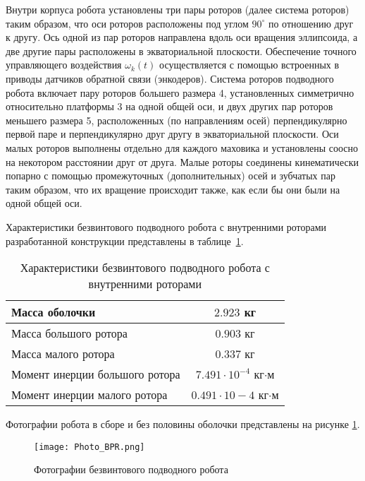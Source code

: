 Внутри корпуса робота установлены три пары роторов (далее система роторов) таким образом, что оси роторов расположены под углом $90^\circ$ по отношению друг к другу. Ось одной из пар роторов направлена вдоль оси вращения эллипсоида, а две другие пары расположены в экваториальной плоскости. Обеспечение точного управляющего воздействия $\omega_k (t)$ осуществляется с помощью встроенных в приводы датчиков обратной связи (энкодеров). Система роторов подводного робота включает пару роторов большего размера 4, установленных симметрично относительно платформы 3 на одной общей оси, и двух других пар роторов меньшего размера 5, расположенных (по направлениям осей) перпендикулярно первой паре и перпендикулярно друг другу в экваториальной плоскости. Оси малых роторов выполнены отдельно для каждого маховика и установлены соосно на некотором расстоянии друг от друга. Малые роторы соединены кинематически попарно с помощью промежуточных (дополнительных) осей и зубчатых пар таким образом, что их вращение происходит также, как если бы они были на одной общей оси.

Характеристики безвинтового подводного робота с внутренними роторами разработанной конструкции представлены в таблице~\ref{tabCharBPR}.

\begin{table}[h]
	\centering
	\caption{Характеристики безвинтового подводного робота с внутренними роторами}\label{tabCharBPR}
	\begin{tabular}{|l|c|}
		\hline
		Масса оболочки	&	$2.923$ кг 	\\ \hline
		Масса большого ротора &	$0.903$ кг	\\ \hline
		Масса малого ротора &	$0.337$ кг \\ \hline
		Момент инерции большого ротора 	& $7.491\cdot10^{-4}$ кг$\cdot$м \\ \hline
		Момент инерции малого ротора &  $0.491\cdot10-4$ кг$\cdot$м\\ \hline
	\end{tabular}
\end{table}

Фотографии робота в сборе и без половины оболочки представлены на рисунке \ref{Photo_BPR}.

\begin{figure}[h]
	\centering
	\texttt{[image: Photo\_BPR.png]}%
	\caption{Фотографии безвинтового подводного робота}
	\label{Photo_BPR}
\end{figure}


